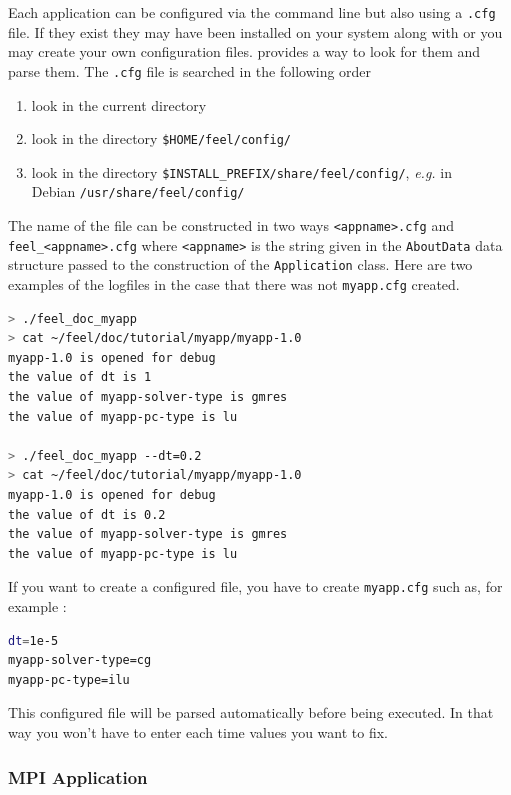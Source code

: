 Each application can be configured via the command line but also using a
\verb|.cfg| file. If they exist they may have been installed on your system
along with \feel or you may create your own configuration files.  \feel provides
a way to look for them and parse them.
\newline
The \verb|.cfg| file is searched in the following order
\begin{enumerate}
\item look in the current directory
\item look in the directory \verb|$HOME/feel/config/|
\item look in the directory \verb|$INSTALL_PREFIX/share/feel/config/|,
  \emph{e.g.} in\\ Debian \verb|/usr/share/feel/config/|
\end{enumerate}
The name of the file can be constructed in two ways \verb|<appname>.cfg| and
\verb|feel_<appname>.cfg| where \verb|<appname>| is the string given in the
\verb|AboutData| data structure passed to the construction of the
\verb|Application| class. 
Here are two examples of the logfiles in the case that there was not \verb|myapp.cfg| created.

\begin{lstlisting}[language=sh]
> ./feel_doc_myapp
> cat ~/feel/doc/tutorial/myapp/myapp-1.0 
myapp-1.0 is opened for debug
the value of dt is 1
the value of myapp-solver-type is gmres
the value of myapp-pc-type is lu 

> ./feel_doc_myapp --dt=0.2
> cat ~/feel/doc/tutorial/myapp/myapp-1.0
myapp-1.0 is opened for debug
the value of dt is 0.2
the value of myapp-solver-type is gmres
the value of myapp-pc-type is lu
\end{lstlisting}

If you want to create a configured file, you have to create \verb|myapp.cfg| such as, for example :
\begin{lstlisting}[language=sh]
dt=1e-5
myapp-solver-type=cg
myapp-pc-type=ilu
\end{lstlisting}
This configured file will be parsed automatically before being executed. In that way you won't have to enter each time values you want to fix. 


\subsubsection{MPI Application}


